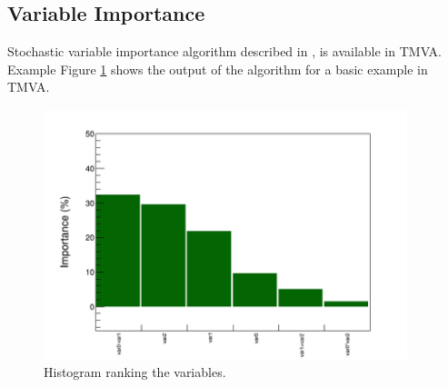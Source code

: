 \documentclass[a4paper]{jpconf}
\begin{document}
\subsection{Variable Importance}
Stochastic variable importance algorithm described in \cite{gleyzer2008paradigm}, 
is available in TMVA.
Example Figure \ref{vi} shows the output of the algorithm for a basic example in TMVA.
% 

\begin{figure}[h]
\centering
\includegraphics[width=25pc]{img/vi.png}\caption{\label{vi} Histogram ranking the variables.}
\end{figure}
\end{document}
